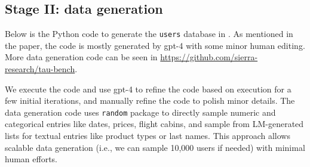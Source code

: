 \newpage 
\subsection{Stage II: data generation} \label{sec:stage2}
Below is the Python code to generate the \texttt{users} database in \retail{}. As mentioned in the paper, the code is mostly generated by gpt-4 with some minor human editing. More data generation code can be seen in \url{https://github.com/sierra-research/tau-bench}.

We execute the code and use gpt-4 to refine the code based on execution for a few initial iterations, and manually refine the code to polish minor details. The data generation code uses \texttt{random} package to directly sample numeric and categorical entries like dates, prices, flight cabins, and sample from LM-generated lists for textual entries like product types or last names. This approach allows scalable data generation (i.e., we can sample 10,000 users if needed) with minimal human efforts. 


